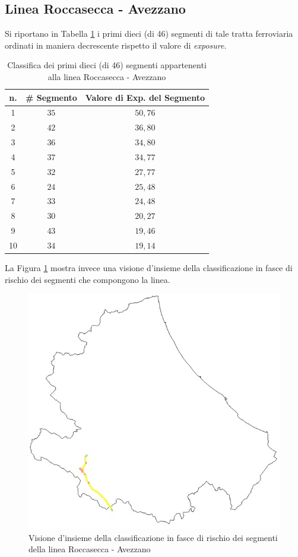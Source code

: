 \subsection{Linea Roccasecca - Avezzano}
Si riportano in Tabella \ref{classificaroccaseccaavezzano} i primi dieci (di 46) segmenti di tale tratta ferroviaria ordinati in maniera decrescente rispetto il valore di \textit{exposure}.
\begin{table}[h]
\centering
\begin{tabular}{|c|c|c|}
\hline
\rowcolor{lightgray}
n. & \# Segmento & Valore di Exp. del Segmento \\ \hline \rowcolor{flamingopink}
1  & $35$        & $50,76$                      \\ \hline \rowcolor{flamingopink}
2  & $42$        & $36,80$                      \\ \hline \rowcolor{flamingopink}
3  & $36$        & $34,80$                      \\ \hline \rowcolor{flamingopink}
4  & $37$        & $34,77$                      \\ \hline \rowcolor{flamingopink}
5  & $32$        & $27,77$                      \\ \hline \rowcolor{flamingopink}
6  & $24$        & $25,48$                      \\ \hline \rowcolor{flamingopink}
7  & $33$       & $24,48$                      \\ \hline \rowcolor{flamingopink}
8  & $30$        & $20,27$                      \\ \hline \rowcolor{icterine}
9  & $43$        & $19,46$                      \\ \hline \rowcolor{icterine}
10 & $34$        & $19,14$                      \\ \hline
\end{tabular}
\caption{Classifica dei primi dieci (di 46) segmenti appartenenti alla linea Roccasecca - Avezzano}
\label{classificaroccaseccaavezzano}
\end{table}
\newline
La Figura \ref{avezzanoroccasecca} mostra invece una visione d'insieme della classificazione in fasce di rischio dei segmenti che compongono la linea.
\begin{figure}[h]
\centering
\includegraphics[width=0.4\linewidth]{img/avezzanoroccasecca.jpeg}
\caption{Visione d'insieme della classificazione in fasce di rischio dei segmenti della linea Roccasecca - Avezzano}
\label{avezzanoroccasecca}
\end{figure}
